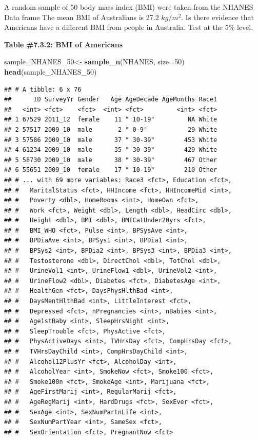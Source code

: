 \documentclass[
]{book}
\newenvironment{Shaded}{\begin{snugshade}}{\end{snugshade}}
\newcommand{\DataTypeTok}[1]{\textcolor[rgb]{0.13,0.29,0.53}{#1}}
\newcommand{\DecValTok}[1]{\textcolor[rgb]{0.00,0.00,0.81}{#1}}
\newcommand{\KeywordTok}[1]{\textcolor[rgb]{0.13,0.29,0.53}{\textbf{#1}}}
\newcommand{\NormalTok}[1]{#1}
\newcommand{\StringTok}[1]{\textcolor[rgb]{0.31,0.60,0.02}{#1}}
\begin{document}
A random sample of 50 body mass index (BMI) were taken from the NHANES Data frame The mean BMI of Australians is 27.2 \(kg/m^2\). Is there evidence that Americans have a different BMI from people in Australia. Test at the 5\% level.

\textbf{Table \#7.3.2: BMI of Americans}

\begin{Shaded}
\begin{Highlighting}[]
\NormalTok{sample_NHANES_}\DecValTok{50}\NormalTok{<-}
\StringTok{  }\KeywordTok{sample_n}\NormalTok{(NHANES, }\DataTypeTok{size=}\DecValTok{50}\NormalTok{)}
\KeywordTok{head}\NormalTok{(sample_NHANES_}\DecValTok{50}\NormalTok{)}
\end{Highlighting}
\end{Shaded}

\begin{verbatim}
## # A tibble: 6 x 76
##      ID SurveyYr Gender   Age AgeDecade AgeMonths Race1
##   <int> <fct>    <fct>  <int> <fct>         <int> <fct>
## 1 67529 2011_12  female    11 " 10-19"         NA White
## 2 57517 2009_10  male       2 " 0-9"           29 White
## 3 57586 2009_10  male      37 " 30-39"        453 White
## 4 61234 2009_10  male      35 " 30-39"        429 White
## 5 58730 2009_10  male      38 " 30-39"        467 Other
## 6 55651 2009_10  female    17 " 10-19"        210 Other
## # ... with 69 more variables: Race3 <fct>, Education <fct>,
## #   MaritalStatus <fct>, HHIncome <fct>, HHIncomeMid <int>,
## #   Poverty <dbl>, HomeRooms <int>, HomeOwn <fct>,
## #   Work <fct>, Weight <dbl>, Length <dbl>, HeadCirc <dbl>,
## #   Height <dbl>, BMI <dbl>, BMICatUnder20yrs <fct>,
## #   BMI_WHO <fct>, Pulse <int>, BPSysAve <int>,
## #   BPDiaAve <int>, BPSys1 <int>, BPDia1 <int>,
## #   BPSys2 <int>, BPDia2 <int>, BPSys3 <int>, BPDia3 <int>,
## #   Testosterone <dbl>, DirectChol <dbl>, TotChol <dbl>,
## #   UrineVol1 <int>, UrineFlow1 <dbl>, UrineVol2 <int>,
## #   UrineFlow2 <dbl>, Diabetes <fct>, DiabetesAge <int>,
## #   HealthGen <fct>, DaysPhysHlthBad <int>,
## #   DaysMentHlthBad <int>, LittleInterest <fct>,
## #   Depressed <fct>, nPregnancies <int>, nBabies <int>,
## #   Age1stBaby <int>, SleepHrsNight <int>,
## #   SleepTrouble <fct>, PhysActive <fct>,
## #   PhysActiveDays <int>, TVHrsDay <fct>, CompHrsDay <fct>,
## #   TVHrsDayChild <int>, CompHrsDayChild <int>,
## #   Alcohol12PlusYr <fct>, AlcoholDay <int>,
## #   AlcoholYear <int>, SmokeNow <fct>, Smoke100 <fct>,
## #   Smoke100n <fct>, SmokeAge <int>, Marijuana <fct>,
## #   AgeFirstMarij <int>, RegularMarij <fct>,
## #   AgeRegMarij <int>, HardDrugs <fct>, SexEver <fct>,
## #   SexAge <int>, SexNumPartnLife <int>,
## #   SexNumPartYear <int>, SameSex <fct>,
## #   SexOrientation <fct>, PregnantNow <fct>
\end{verbatim}
\end{document}
